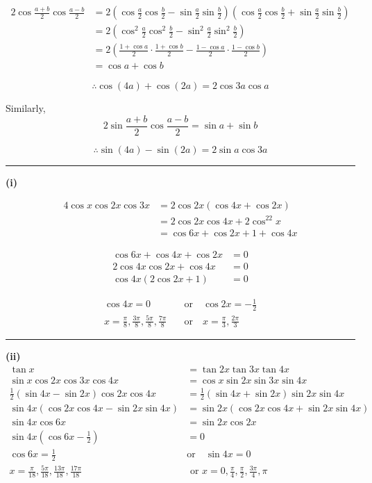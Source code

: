 \documentclass[12pt]{article}
\begin{document}
\newcommand{\ds}{\displaystyle}



\begin{align*}
2\cos\frac{a+b}{2}\cos\frac{a-b}{2}
&=2\left(\cos\frac a2\cos\frac b2-\sin\frac a2\sin\frac b2\right)
\left(\cos\frac a2\cos\frac b2+\sin\frac a2\sin\frac b2\right)\\
&=2\left(\cos^2\frac a2\cos^2\frac b2-\sin^2\frac a2\sin^2\frac b2\right)\\
&=2\left(\frac{1+\cos a}{2}\cdot\frac{1+\cos b}{2}
-\frac{1-\cos a}{2}\cdot\frac{1-\cos b}{2}\right)\\
&=\cos a+\cos b
\end{align*}

$$\therefore \cos(4a)+\cos(2a)=2\cos3a\cos a$$


Similarly, 
$$2\sin\frac{a+b}{2}\cos\frac{a-b}{2}=\sin a+\sin b$$

$$\therefore \sin(4a)-\sin(2a)=2\sin a\cos3a$$

\bigskip\hrule\bigskip

\textbf{(i)}

\begin{align*}
4\cos x\cos2x\cos3x
&=2\cos2x(\cos4x+\cos2x)\\
&=2\cos2x\cos4x+2\cos^22x\\
&=\cos6x+\cos2x+1+\cos4x
\end{align*}

\begin{align*}
\cos6x+\cos4x+\cos2x&=0\\
2\cos4x\cos2x+\cos4x&=0\\
\cos4x(2\cos2x+1)&=0
\end{align*}

\begin{align*}
\cos4x=0\quad &\text{or}\quad \cos2x=-\frac12\\
x=\frac{\pi}{8},\frac{3\pi}{8},\frac{5\pi}{8},\frac{7\pi}{8}\quad &\text{or}\quad x=\frac{\pi}{3},\frac{2\pi}{3}
\end{align*}

\bigskip\hrule\bigskip

\textbf{(ii)}
\begin{align*}
\tan x&=\tan2x\tan3x\tan4x\\
\sin x\cos2x\cos3x\cos4x
&=\cos x\sin2x\sin3x\sin4x\\
\frac12(\sin4x-\sin2x)\cos2x\cos4x
&=\frac12(\sin4x+\sin2x)\sin2x\sin4x\\
\sin4x(\cos2x\cos4x-\sin2x\sin4x)
&=\sin2x(\cos2x\cos4x+\sin2x\sin4x)\\
\sin4x\cos6x
&=\sin2x\cos2x\\
\sin4x\left(\cos6x-\frac12\right)
&=0\\
\cos6x=\frac12\quad &\text{or}\quad \sin4x=0\\
x=\frac{\pi}{18},\frac{5\pi}{18},\frac{13\pi}{18},\frac{17\pi}{18} &\text{ or } x=0,\frac{\pi}{4},\frac{\pi}{2},\frac{3\pi}{4},\pi
\end{align*}
\end{document}
